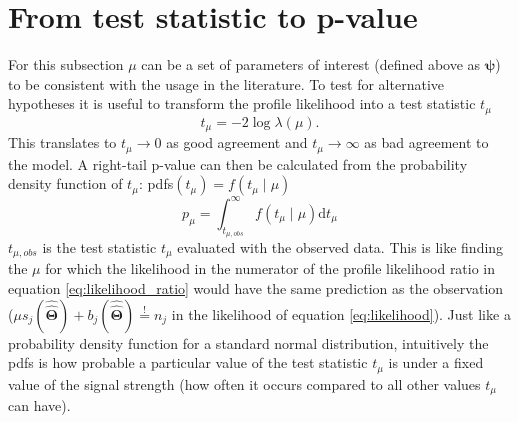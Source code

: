 \section{From test statistic to p-value}
For this subsection $\mu$ can be a set of parameters of interest (defined above as $\bm{\psi}$) to be consistent with the usage in the literature. To test for alternative hypotheses it is useful to transform the profile likelihood into a test statistic $t_{\mu}$ 
\begin{equation}
    t_{\mu}=-2\log \lambda(\mu).
\end{equation}
This translates to $t_{\mu} \rightarrow 0$ as good agreement and $t_{\mu} \rightarrow \infty$ as bad agreement to the model. A right-tail p-value can then be calculated from the probability density function of $t_\mu$: \acp{pdf}$(t_\mu) = f(t_\mu \mid \mu)$
\begin{equation}\label{eq:p-value}
    p_\mu = \int_{t_{\mu ,obs}}^{\infty} 
    f(t_\mu \mid \mu) \mathrm{d}t_\mu
\end{equation}
$t_{\mu ,obs}$ is the test statistic $t_\mu$ evaluated with the observed data. This is like finding the $\mu$ for which the likelihood in the numerator of the profile likelihood ratio in equation \ref{eq:likelihood_ratio} would have the same prediction as the observation ($\mu s_j(\hat{\hat{\bm{\Theta}}}) + b_j(\hat{\hat{\bm{\Theta}}})\stackrel{!}{=}n_j$ in the likelihood of equation \ref{eq:likelihood}). Just like a probability density function for a standard normal distribution, intuitively the \acp{pdf} is how probable a particular value of the test statistic $t_\mu$ is under a fixed value of the signal strength (how often it occurs compared to all other values $t_\mu$ can have). 

